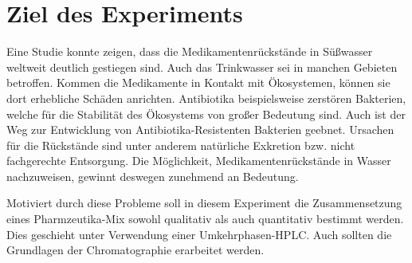 \section{Ziel des Experiments}
  
  Eine Studie konnte zeigen, dass die Medikamentenrückstände in Süßwasser weltweit deutlich gestiegen sind. Auch das Trinkwasser sei in manchen Gebieten betroffen. Kommen die Medikamente in Kontakt mit Ökosystemen, können sie dort erhebliche Schäden anrichten. Antibiotika beispielsweise zerstören Bakterien, welche für die Stabilität des Ökosystems von großer Bedeutung sind. Auch ist der Weg zur Entwicklung von Antibiotika-Resistenten Bakterien geebnet. \citep{MedicamentsORF} Ursachen für die Rückstände sind unter anderem natürliche Exkretion bzw. nicht fachgerechte Entsorgung. \citep{Versuchsvorschrift} Die Möglichkeit, Medikamentenrückstände in Wasser nachzuweisen, gewinnt deswegen zunehmend an Bedeutung.
  
  Motiviert durch diese Probleme soll in diesem Experiment die Zusammensetzung eines Pharmzeutika-Mix sowohl qualitativ als auch quantitativ bestimmt werden. Dies geschieht unter Verwendung einer Umkehrphasen-HPLC. Auch sollten die Grundlagen der Chromatographie erarbeitet werden. 